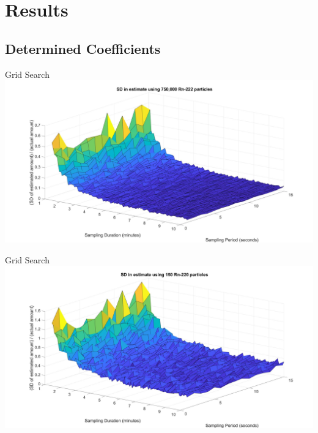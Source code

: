 \documentclass{beamer}
\begin{document}
\section{Results}
\subsection{Determined Coefficients}
\begin{frame}{Grid Search}
    \includegraphics[width=\textwidth]{images/std_rn222_gridsearch.jpg}
\end{frame}

\begin{frame}{Grid Search}
    \includegraphics[width=\textwidth]{images/std_rn220_gridsearch.jpg}
\end{frame}
\end{document}
